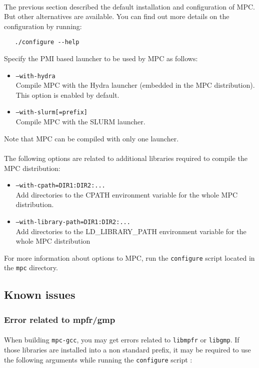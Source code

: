 \documentclass[a4paper,11pt]{article}
\begin{document}
\paragraph{}
The previous section described the default installation and configuration of MPC.
But other alternatives are available. You can find out more details on the
configuration by running:

\begin{lstlisting}
   ./configure --help
\end{lstlisting}

\newpage
Specify the PMI based launcher to be used by MPC as follows:
\begin{itemize}
\item \texttt{--with-hydra} \\
	Compile MPC with the Hydra launcher (embedded in the MPC distribution).
	This option is enabled by default.
\item \texttt{--with-slurm[=prefix]} \\
	Compile MPC with the SLURM launcher.
\end{itemize}
Note that MPC can be compiled with only one launcher.
\\
\\
\indent The following options are related to additional libraries required to compile the MPC distribution:
\begin{itemize}
\item \texttt{--with-cpath=DIR1:DIR2:...}   \\
    Add directories to the CPATH environment variable for the whole MPC distribution.
\item  \texttt{--with-library-path=DIR1:DIR2:...}\\
    Add directories to the LD\_LIBRARY\_PATH environment variable for the whole MPC distribution
\end{itemize}

For more information about options to MPC, run the \texttt{configure} script located in the \texttt{mpc} directory.

\subsection{Known issues}
\label{sec:installationKnownBugs}

\subsubsection{Error related to mpfr/gmp}
\paragraph{}
When building \texttt{mpc-gcc}, you may get errors related to  \texttt{libmpfr} or \texttt{libgmp}.
If those libraries are installed into a non standard prefix, it may be required to use the following
arguments while running the \texttt{configure} script :
\end{document}

